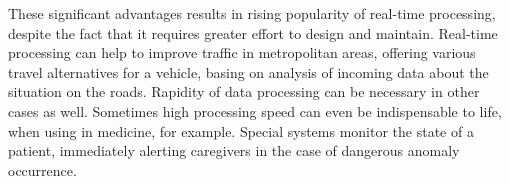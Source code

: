 These significant advantages results in rising popularity of real-time processing, despite the fact that it requires greater effort to design and maintain.
Real-time processing can help to improve traffic in metropolitan areas, offering various travel alternatives for a vehicle, basing on analysis of incoming data about the situation on the roads.
Rapidity of data processing can be necessary in other cases as well.
Sometimes high processing speed can even be indispensable to life, when using in medicine, for example.
Special systems monitor the state of a patient, immediately alerting caregivers in the case of dangerous anomaly occurrence. 








